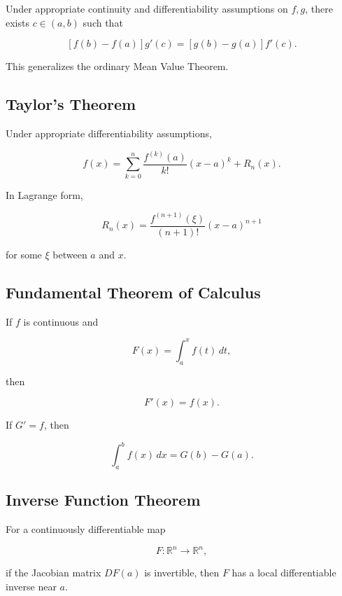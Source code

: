 Under appropriate continuity and differentiability assumptions on \(f,g\),
there exists \(c\in(a,b)\) such that

\[
\boxed{
[f(b)-f(a)]g'(c)
=
[g(b)-g(a)]f'(c).
}
\]

This generalizes the ordinary Mean Value Theorem.

\subsection{Taylor's Theorem}
\label{subsec:taylors-theorem-summary}

Under appropriate differentiability assumptions,

\[
\boxed{
f(x)
=
\sum_{k=0}^{n}
\frac{
f^{(k)}(a)
}{
k!
}
(x-a)^k
+
R_n(x).
}
\]

In Lagrange form,

\[
\boxed{
R_n(x)
=
\frac{
f^{(n+1)}(\xi)
}{
(n+1)!
}
(x-a)^{n+1}
}
\]

for some \(\xi\) between \(a\) and \(x\).

\subsection{Fundamental Theorem of Calculus}
\label{subsec:fundamental-theorem-calculus-summary}

If \(f\) is continuous and

\[
F(x)
=
\int_a^x
f(t)\,dt,
\]

then

\[
\boxed{
F'(x)=f(x).
}
\]

If \(G'=f\), then

\[
\boxed{
\int_a^b
f(x)\,dx
=
G(b)-G(a).
}
\]

\subsection{Inverse Function Theorem}
\label{subsec:inverse-function-theorem-summary}

For a continuously differentiable map

\[
F:\mathbb{R}^n\to\mathbb{R}^n,
\]

if the Jacobian matrix \(DF(a)\) is invertible, then \(F\) has a local
differentiable inverse near \(a\).

